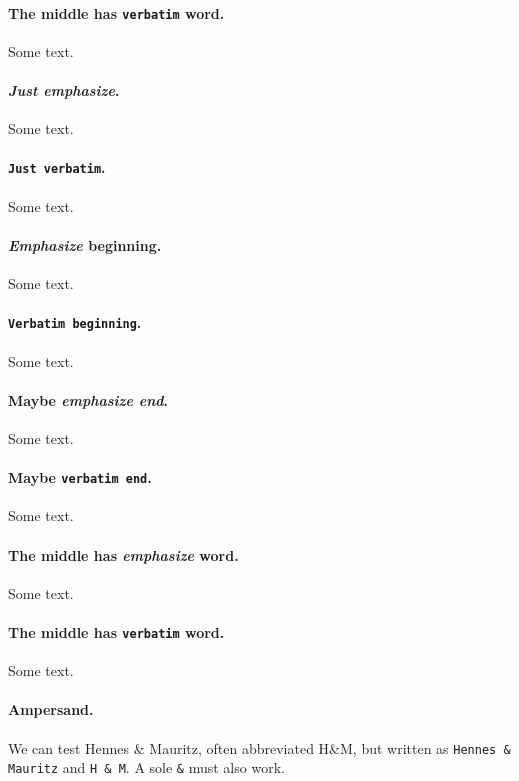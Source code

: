 \documentclass[%
oneside,                 %
final,                   %
10pt]{article}
\theoremstyle{definition}
\begin{document}
\begin{enumerate}
\paragraph{The middle has \texttt{verbatim} word.}
Some text.

\paragraph{\emph{Just emphasize}.}
Some text.

\paragraph{\texttt{Just verbatim}.}
Some text.

\paragraph{\emph{Emphasize} beginning.}
Some text.

\paragraph{\texttt{Verbatim beginning}.}
Some text.

\paragraph{Maybe \emph{emphasize end}.}
Some text.

\paragraph{Maybe \texttt{verbatim end}.}
Some text.

\paragraph{The middle has \emph{emphasize} word.}
Some text.

\paragraph{The middle has \texttt{verbatim} word.}
Some text.

\paragraph{Ampersand.}
We can test Hennes {\&} Mauritz, often abbreviated H{\&}M, but written
as \Verb!Hennes & Mauritz! and \Verb!H & M!.
A sole \Verb!&! must also work.





\end{enumerate}
\end{document}
